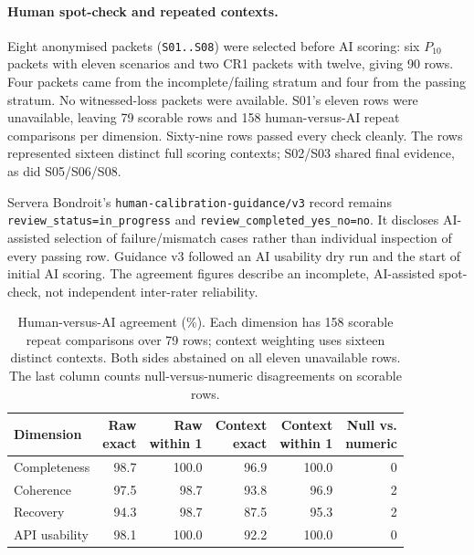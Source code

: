 \paragraph{Human spot-check and repeated contexts.}
Eight anonymised packets (\texttt{S01..S08}) were selected before AI scoring:
six $P_{10}$ packets with eleven scenarios and two CR1 packets with twelve,
giving 90 rows. Four packets came from the incomplete/failing stratum and
four from the passing stratum. No witnessed-loss packets were available.
S01's eleven rows were unavailable, leaving 79 scorable rows and 158
human-versus-AI repeat comparisons per dimension. Sixty-nine rows passed
every check cleanly. The rows represented sixteen distinct full scoring
contexts; S02/S03 shared final evidence, as did S05/S06/S08.

Servera Bondroit's \nolinkurl{human-calibration-guidance/v3} record remains
\nolinkurl{review_status=in_progress} and
\nolinkurl{review_completed_yes_no=no}. It discloses AI-assisted selection
of failure/mismatch cases rather than individual inspection of every
passing row. Guidance v3 followed an AI usability dry run and the start
of initial AI scoring. The agreement figures describe an incomplete, AI-assisted spot-check,
not independent inter-rater reliability.

\begin{table}[!htbp]
\centering\footnotesize
\setlength{\tabcolsep}{4pt}
\caption{Human-versus-AI agreement (\%). Each dimension has 158 scorable
repeat comparisons over 79 rows; context weighting uses sixteen distinct
contexts. Both sides abstained on all eleven unavailable rows. The last
column counts null-versus-numeric disagreements on scorable rows.}\label{tab:resultscalibration}

\begin{tabular*}{\textwidth}{@{\extracolsep{\fill}}lrrrrr@{}}
\toprule
Dimension & \shortstack{Raw\\exact} & \shortstack{Raw\\within 1} & \shortstack{Context\\exact} & \shortstack{Context\\within 1} & \shortstack{Null vs.\\numeric} \\
\midrule
Completeness & 98.7 & 100.0 & 96.9 & 100.0 & 0 \\
Coherence & 97.5 & 98.7 & 93.8 & 96.9 & 2 \\
Recovery & 94.3 & 98.7 & 87.5 & 95.3 & 2 \\
API usability & 98.1 & 100.0 & 92.2 & 100.0 & 0 \\
\bottomrule
\end{tabular*}
\end{table}

